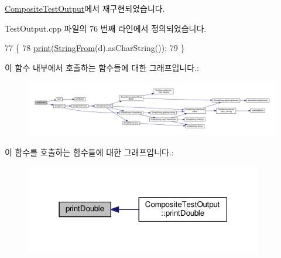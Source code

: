 \hyperlink{class_composite_test_output_a0ed13c187762336a2bf0fd89687b014a}{Composite\+Test\+Output}에서 재구현되었습니다.



Test\+Output.\+cpp 파일의 76 번째 라인에서 정의되었습니다.


\begin{DoxyCode}
77 \{
78     \hyperlink{class_test_output_a321b5c489a90374cb61c34fe5d2253ef}{print}(\hyperlink{_simple_string_8h_a195ee4ca8d909f9ebf37e963d4564446}{StringFrom}(d).asCharString());
79 \}
\end{DoxyCode}


이 함수 내부에서 호출하는 함수들에 대한 그래프입니다.\+:
\nopagebreak
\begin{figure}[H]
\begin{center}
\leavevmode
\includegraphics[width=350pt]{class_test_output_a0ed13c187762336a2bf0fd89687b014a_cgraph}
\end{center}
\end{figure}




이 함수를 호출하는 함수들에 대한 그래프입니다.\+:
\nopagebreak
\begin{figure}[H]
\begin{center}
\leavevmode
\includegraphics[width=295pt]{class_test_output_a0ed13c187762336a2bf0fd89687b014a_icgraph}
\end{center}
\end{figure}


